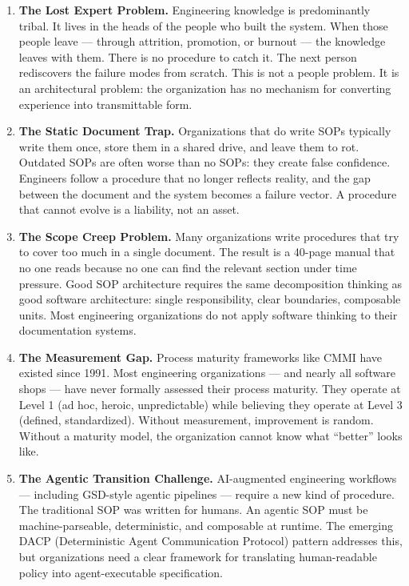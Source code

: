 \documentclass[11pt,letterpaper]{article}
\begin{document}
\begin{enumerate}[leftmargin=1.5em]

\item \textbf{The Lost Expert Problem.} Engineering knowledge is predominantly tribal. It lives in the heads of the people who built the system. When those people leave --- through attrition, promotion, or burnout --- the knowledge leaves with them. There is no procedure to catch it. The next person rediscovers the failure modes from scratch. This is not a people problem. It is an architectural problem: the organization has no mechanism for converting experience into transmittable form.

\item \textbf{The Static Document Trap.} Organizations that do write SOPs typically write them once, store them in a shared drive, and leave them to rot. Outdated SOPs are often worse than no SOPs: they create false confidence. Engineers follow a procedure that no longer reflects reality, and the gap between the document and the system becomes a failure vector. A procedure that cannot evolve is a liability, not an asset.

\item \textbf{The Scope Creep Problem.} Many organizations write procedures that try to cover too much in a single document. The result is a 40-page manual that no one reads because no one can find the relevant section under time pressure. Good SOP architecture requires the same decomposition thinking as good software architecture: single responsibility, clear boundaries, composable units. Most engineering organizations do not apply software thinking to their documentation systems.

\item \textbf{The Measurement Gap.} Process maturity frameworks like CMMI have existed since 1991. Most engineering organizations --- and nearly all software shops --- have never formally assessed their process maturity. They operate at Level 1 (ad hoc, heroic, unpredictable) while believing they operate at Level 3 (defined, standardized). Without measurement, improvement is random. Without a maturity model, the organization cannot know what ``better'' looks like.

\item \textbf{The Agentic Transition Challenge.} AI-augmented engineering workflows --- including GSD-style agentic pipelines --- require a new kind of procedure. The traditional SOP was written for humans. An agentic SOP must be machine-parseable, deterministic, and composable at runtime. The emerging DACP (Deterministic Agent Communication Protocol) pattern addresses this, but organizations need a clear framework for translating human-readable policy into agent-executable specification.

\end{enumerate}
\end{document}
